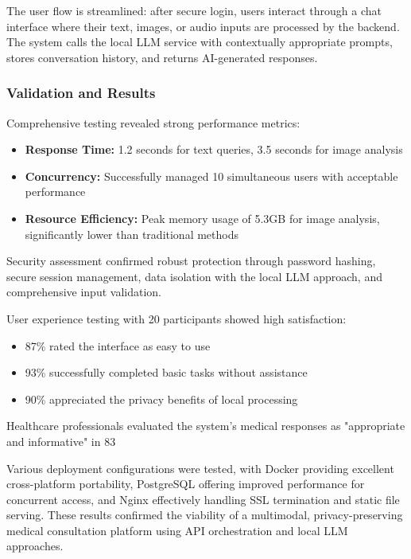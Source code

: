 The user flow is streamlined: after secure login, users interact through a chat interface where their text, images, or audio inputs are processed by the backend. The system calls the local LLM service with contextually appropriate prompts, stores conversation history, and returns AI-generated responses.

\subsubsection{Validation and Results}
Comprehensive testing revealed strong performance metrics:

\begin{itemize}
    \item \textbf{Response Time:} 1.2 seconds for text queries, 3.5 seconds for image analysis
    \item \textbf{Concurrency:} Successfully managed 10 simultaneous users with acceptable performance
    \item \textbf{Resource Efficiency:} Peak memory usage of 5.3GB for image analysis, significantly lower than traditional methods
\end{itemize}

Security assessment confirmed robust protection through password hashing, secure session management, data isolation with the local LLM approach, and comprehensive input validation.

User experience testing with 20 participants showed high satisfaction:
\begin{itemize}
    \item 87\% rated the interface as easy to use
    \item 93\% successfully completed basic tasks without assistance
    \item 90\% appreciated the privacy benefits of local processing
\end{itemize}

Healthcare professionals evaluated the system's medical responses as "appropriate and informative" in 83%

Various deployment configurations were tested, with Docker providing excellent cross-platform portability, PostgreSQL offering improved performance for concurrent access, and Nginx effectively handling SSL termination and static file serving. These results confirmed the viability of a multimodal, privacy-preserving medical consultation platform using API orchestration and local LLM approaches.